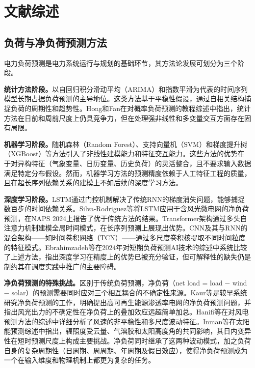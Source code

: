 \chapter{文献综述}

\section{负荷与净负荷预测方法}

电力负荷预测是电力系统运行与规划的基础环节，其方法论发展可划分为三个阶段。

\textbf{统计方法阶段。}以自回归积分滑动平均（ARIMA）和指数平滑为代表的时间序列模型长期占据负荷预测的主导地位。这类方法基于平稳性假设，通过自相关结构捕捉负荷的周期性和趋势性。Hong和Fan\cite{hong2016probabilistic}在对概率负荷预测的教程综述中指出，统计方法在日前和周前尺度上仍具竞争力，但在处理强非线性和多变量交互方面存在固有局限。

\textbf{机器学习阶段。}随机森林（Random Forest）、支持向量机（SVM）和梯度提升树（XGBoost）等方法引入了非线性建模能力和特征交互能力。这些方法的优势在于对异构特征（气象变量、日历变量、历史负荷）的灵活整合，且不要求输入数据满足特定分布假设\cite{wang2023hybrid}。然而，机器学习方法的预测精度依赖于人工特征工程的质量，且在超长序列依赖关系的建模上不如后续的深度学习方法。

\textbf{深度学习阶段。}LSTM通过门控机制解决了传统RNN的梯度消失问题，能够捕捉数百步的时间依赖关系。Silva-Rodriguez等\cite{silva2024lstm}将LSTM应用于含风光微电网的净负荷预测，在NAPS 2024上报告了优于传统方法的结果。Transformer架构通过多头自注意力机制建模全局时间模式，在长序列预测上展现出优势\cite{ebrahimzadeh2024ai}。CNN及其与RNN的混合架构——如时间卷积网络（TCN）——通过多尺度卷积核提取不同时间粒度的特征模式\cite{wang2023hybrid}。Ebrahimzadeh等\cite{ebrahimzadeh2024ai}在2024年对短期负荷预测AI技术的综述中系统比较了上述方法，指出深度学习在精度上的优势已被充分验证，但可解释性的缺失仍是制约其在调度实践中推广的主要障碍。

\textbf{净负荷预测的特殊挑战。}区别于传统负荷预测，净负荷（net load = load $-$ wind $-$ solar）的预测需要同时应对三个相互耦合的不确定性来源。Kaur等\cite{kaur2016net}是较早系统研究净负荷预测的工作，明确提出高可再生能源渗透率电网的净负荷预测问题，并指出风光出力的不确定性在净负荷上的叠加效应远超简单加总。Hanifi等\cite{hanifi2020critical}在对风电预测方法的综述中详细分析了风速的非平稳性和多尺度波动特征。Inman等\cite{inman2013solar}在太阳能预测综述中指出，辐照度受云量、气溶胶和太阳高度角的共同影响，其日内变异性在短时预测尺度上构成主要挑战。净负荷同时继承了这两种波动模式，加之负荷自身的复杂周期性（日周期、周周期、年周期及假日效应），使得净负荷预测成为一个在输入维度和物理机制上都更为复杂的任务。

